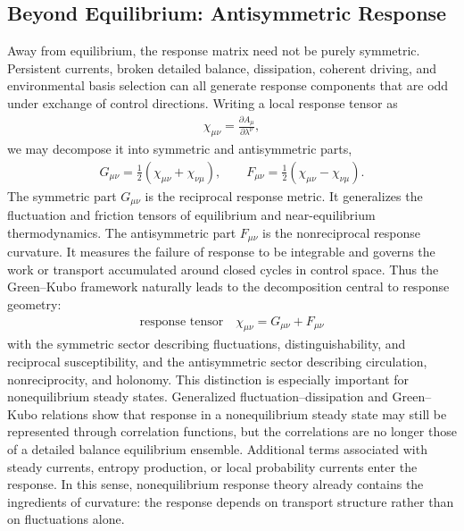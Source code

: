 \subsection{Beyond Equilibrium: Antisymmetric Response}
Away from equilibrium, the response matrix need not be purely
symmetric. Persistent currents, broken detailed balance,
dissipation, coherent driving, and environmental basis selection
can all generate response components that are odd under
exchange of control directions. Writing a local response tensor as
\begin{align}
\chi_{\mu\nu}
=
\frac{\partial A_\mu}{\partial\lambda^\nu},
\end{align}
we may decompose it into symmetric and antisymmetric parts,
\begin{align}
G_{\mu\nu}
=
\frac12
\left(
\chi_{\mu\nu}+\chi_{\nu\mu}
\right),
\qquad
F_{\mu\nu}
=
\frac12
\left(
\chi_{\mu\nu}-\chi_{\nu\mu}
\right).
\label{eq:GF_decomp_kubo}
\end{align}
The symmetric part \(G_{\mu\nu}\) is the reciprocal response
metric. It generalizes the fluctuation and friction tensors of
equilibrium and near-equilibrium thermodynamics. The
antisymmetric part \(F_{\mu\nu}\) is the nonreciprocal response
curvature. It measures the failure of response to be integrable
and governs the work or transport accumulated around closed
cycles in control space.
Thus the Green--Kubo framework naturally leads to the
decomposition central to response geometry:
\begin{align}
\boxed{
\textrm{response tensor}
\quad
\chi_{\mu\nu}
=
G_{\mu\nu}
+
F_{\mu\nu}
}
\end{align}
with the symmetric sector describing fluctuations,
distinguishability, and reciprocal susceptibility, and the
antisymmetric sector describing circulation, nonreciprocity, and
holonomy.
This distinction is especially important for nonequilibrium
steady states. Generalized fluctuation--dissipation and
Green--Kubo relations show that response in a nonequilibrium
steady state may still be represented through correlation
functions, but the correlations are no longer those of a detailed
balance equilibrium ensemble. Additional terms associated with
steady currents, entropy production, or local probability currents
enter the response. In this sense, nonequilibrium response theory
already contains the ingredients of curvature: the response
depends on transport structure rather than on fluctuations alone.

